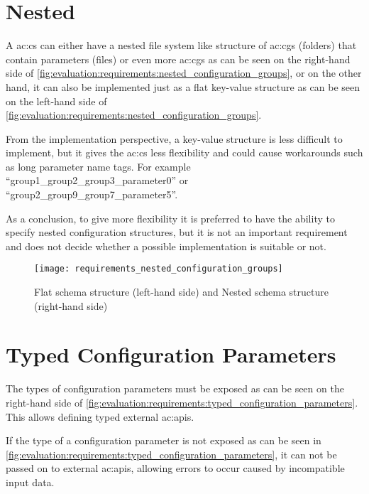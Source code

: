 \section{Nested }
\label{sec:requirements:nested_configuration_groups}

A \gls{ac:cs} can either have a nested file system like structure of \glspl{ac:cg} (folders) that contain parameters (files) or even more \glspl{ac:cg} as can be seen on the right-hand side of \autoref{fig:evaluation:requirements:nested_configuration_groups}, or on the other hand, it can also be implemented just as a flat key-value structure as can be seen on the left-hand side of \autoref{fig:evaluation:requirements:nested_configuration_groups}.

From the implementation perspective, a key-value structure is less difficult to implement, but it gives the \gls{ac:cs} less flexibility and could cause workarounds such as long parameter name tags. For example ``group1\_group2\_group3\_parameter0'' or ``group2\_group9\_group7\_parameter5''.

As a conclusion, to give more flexibility it is preferred to have the ability to specify nested configuration structures, but it is not an important requirement and does not decide whether a possible implementation is suitable or not.

\begin{figure}[H]
    \centering
    \texttt{[image: requirements\_nested\_configuration\_groups]}
    \caption{Flat schema structure (left-hand side) and Nested schema structure (right-hand side)}
    \label{fig:evaluation:requirements:nested_configuration_groups}
\end{figure}

\section{Typed Configuration Parameters}
\label{sec:requirements:typed_configuration_parameters}

The types of configuration parameters must be exposed as can be seen on the right-hand side of \autoref{fig:evaluation:requirements:typed_configuration_parameters}.
This allows defining typed external \glspl{ac:api}.

If the type of a configuration parameter is not exposed as can be seen in \autoref{fig:evaluation:requirements:typed_configuration_parameters}, it can not be passed on to external \glspl{ac:api}, allowing errors to occur caused by incompatible input data.

